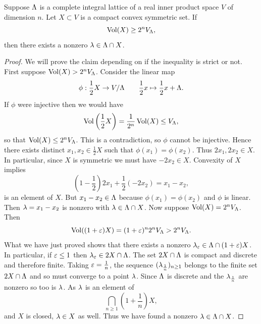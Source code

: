     \begin{theorem*}
      Suppose \(\Lambda\) is a complete integral lattice of a real inner product space \(V\) of dimension \(n\). Let \(X \subset V\) is a compact convex symmetric set. If
      \[
        \operatorname{\mathrm{Vol}}(X) \ge 2^{n}V_{\Lambda},
      \]
      then there exists a nonzero \(\lambda \in \Lambda \cap X\).
    \end{theorem*}
    \begin{proof}
      We will prove the claim depending on if the inequality is strict or not. First suppose \(\operatorname{\mathrm{Vol}}(X) > 2^{n}V_{\Lambda}\). Consider the linear map
      \[
        \phi:\frac{1}{2}X \to V/\Lambda \qquad \frac{1}{2}x \mapsto \frac{1}{2}x+\Lambda.
      \]
      If \(\phi\) were injective then we would have
      \[
        \operatorname{\mathrm{Vol}}\left(\frac{1}{2}X\right) = \frac{1}{2^{n}}\operatorname{\mathrm{Vol}}(X) \le V_{\Lambda}, 
      \]
      so that \(\operatorname{\mathrm{Vol}}(X) \le  2^{n}V_{\Lambda}\). This is a contradiction, so \(\phi\) cannot be injective. Hence there exists distinct \(x_{1},x_{2} \in \frac{1}{2}X\) such that \(\phi(x_{1}) = \phi(x_{2})\). Thus \(2x_{1},2x_{2} \in X\). In particular, since \(X\) is symmetric we must have \(-2x_{2} \in X\). Convexity of \(X\) implies
      \[
        \left(1-\frac{1}{2}\right)2x_{1}+\frac{1}{2}(-2x_{2}) = x_{1}-x_{2},
      \]
      is an element of \(X\). But \(x_{1}-x_{2} \in \Lambda\) because \(\phi(x_{1}) = \phi(x_{2})\) and \(\phi\) is linear. Then \(\lambda = x_{1}-x_{2}\) is nonzero with \(\lambda \in \Lambda \cap X\). Now suppose \(\operatorname{\mathrm{Vol}}(X) = 2^{n}V_{\Lambda}\). Then
      \[
        \operatorname{\mathrm{Vol}}((1+\varepsilon)X) = (1+\varepsilon)^{n}2^{n}V_{\Lambda} > 2^{n}V_{\Lambda}.
      \]
      What we have just proved shows that there exists a nonzero \(\lambda_{\varepsilon} \in \Lambda \cap (1+\varepsilon)X\). In particular, if \(\varepsilon \le 1\) then \(\lambda_{\varepsilon} \in 2X \cap \Lambda\). The set \(2X \cap \Lambda\) is compact and discrete and therefore finite. Taking \(\varepsilon = \frac{1}{n}\), the sequence \((\lambda_{\frac{1}{n}})_{n \ge 1}\) belongs to the finite set \(2X \cap \Lambda\) and so must converge to a point \(\lambda\). Since \(\Lambda\) is discrete and the \(\lambda_{\frac{1}{n}}\) are nonzero so too is \(\lambda\). As \(\lambda\) is an element of
      \[
        \bigcap_{n \ge 1}\left(1+\frac{1}{n}\right)X,
      \]
      and \(X\) is closed, \(\lambda \in X\) as well. Thus we have found a nonzero \(\lambda \in \Lambda \cap X\).
    \end{proof}